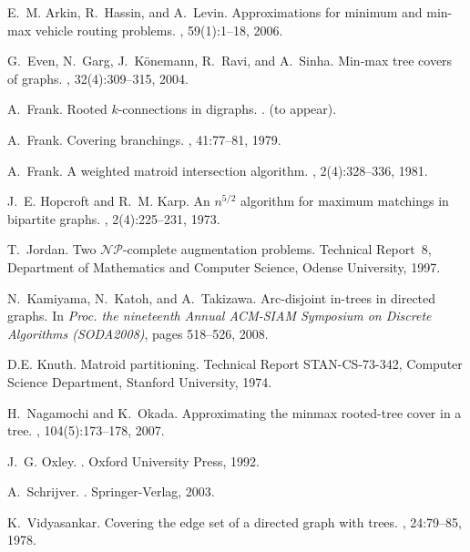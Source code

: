 \documentclass[11pt]{article}
\newcounter{ni}
\newcounter{san}
\theoremstyle{plain}
\begin{document}
\begin{thebibliography}{14}

E.~M. Arkin, R.~Hassin, and A.~Levin.
\newblock Approximations for minimum and min-max vehicle routing problems.
, 59(1):1--18, 2006.

G.~Even, N.~Garg, J.~K{\"o}nemann, R.~Ravi, and A.~Sinha.
\newblock Min-max tree covers of graphs.
, 32(4):309--315, 2004.

A.~Frank.
\newblock Rooted {$k$}-connections in digraphs.
.
\newblock (to appear).

A.~Frank.
\newblock Covering branchings.
, 41:77--81, 1979.

A.~Frank.
\newblock A weighted matroid intersection algorithm.
, 2(4):328--336, 1981.

J.~E. Hopcroft and R.~M. Karp.
\newblock An {$n^{5/2}$} algorithm for maximum matchings in bipartite graphs.
, 2(4):225--231, 1973.

T.~Jordan.
\newblock Two {$\mathcal{NP}$}-complete augmentation problems.
\newblock Technical Report~8, {D}epartment of {M}athematics and {C}omputer
  {S}cience, {O}dense {U}niversity, 1997.

N.~Kamiyama, N.~Katoh, and A.~Takizawa.
\newblock Arc-disjoint in-trees in directed graphs.
\newblock In {\em Proc. the nineteenth Annual ACM-SIAM Symposium on Discrete
  Algorithms (SODA2008)}, pages 518--526, 2008.

D.E. Knuth.
\newblock Matroid partitioning.
\newblock Technical Report {STAN-CS}-73-342, {C}omputer {S}cience {D}epartment,
  {S}tanford {U}niversity, 1974.

H.~Nagamochi and K.~Okada.
\newblock Approximating the minmax rooted-tree cover in a tree.
, 104(5):173--178, 2007.

J.~G. Oxley.
.
\newblock Oxford University Press, 1992.

A.~Schrijver.
.
\newblock Springer-Verlag, 2003.

K.~Vidyasankar.
\newblock Covering the edge set of a directed graph with trees.
, 24:79--85, 1978.

\end{thebibliography}
\end{document}
